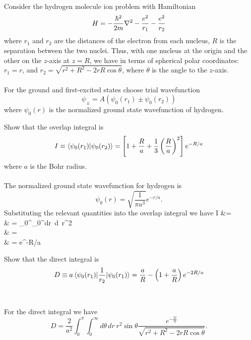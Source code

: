 \documentclass[11pt,letterpaper]{article}
\begin{document}
	\\
	\\
	\\
	\item
	Consider the hydrogen molecule ion problem with Hamiltonian
	\[
		H = -\frac{\hbar^2}{2m}\nabla^2-\frac{e^2}{r_1}-\frac{e^2}{r_2}
	\]
	where $r_1$ and $r_2$ are the distances of the electron from each nucleus, $R$ is the separation between the two nuclei. Thus, with 
	one nucleus at the origin and the other on the $z$-axis at $z=R$, we have in terms of spherical polar coordinates:
	$r_1=r$, and $r_2 = \sqrt{r^2+R^2-2rR\cos\theta}$, where $\theta$ is the angle to the $z$-axis. 
	\\
	\\
	For the ground and first-excited states choose trial wavefunction
	\[
		\psi_\pm = A(\psi_0(r_1)\pm\psi_0(r_2))
	\]
	where $\psi_0(r)$ is the normalized ground state wavefunction of hydrogen. 
	\benum
		\item
		Show that the overlap integral is
		\[
			I \equiv \braket{\psi_0(r_1)|\psi_0(r_2)} = \left[1+\frac{R}{a}+\frac{1}{3}\left(\frac{R}{a}\right)^2\right]e^{-R/a}
		\]
		where $a$ is the Bohr radius.
		\\
		\\
		The normalized ground state wavefunction for hydrogen is 
		\[
			\psi_0(r) = \sqrt{\frac{1}{\pi a^3}}e^{-r/a}.
		\]
		Substituting the relevant quantities into the overlap integral we have
		\ba
			I &=  \intasphere \exp{}\exp{} 
			\\
			& = \int_0^\pi \int_0^\infty dr\, d\theta\  r^2\sin\theta \exp{}\exp{} 
			\\
			& = 
			\\
			& =  e^{-R/a}
		\ea
		\item
		Show that the direct integral is 
		\[
			D \equiv a\braket{\psi_0(r_1)|\frac{1}{r_2}|\psi_0(r_1)} = \frac{a}{R}-\left(1+\frac{a}{R}\right)e^{-2R/a}
		\]
		\\
		\\
		For the direct integral we have
		\[
			D = \frac{2}{a^2}\int_0^\pi \int_0^\infty d\theta\, dr\ r^2\sin\theta\frac{e^{-\frac{2r}{a}}}{\sqrt{r^2+R^2-2rR\cos\theta}}.
		\]
\end{document}
